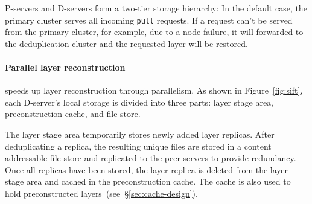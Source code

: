 P-servers and D-servers form a two-tier storage hierarchy:
In the default case, the primary cluster serves all incoming \texttt{pull} requests.
If a request can't be served from the primary cluster, for example, due to a node failure,
it will forwarded to the deduplication cluster and the requested layer will be restored.
%
%

\paragraph{Parallel layer reconstruction}

\sysname speeds up layer reconstruction through parallelism. As shown in Figure~\ref{fig:sift},
each D-server's local storage is divided into three parts: layer stage area, preconstruction cache,
and file store.
%

The layer stage area temporarily stores newly added layer replicas.
After deduplicating a replica, the resulting unique files are stored in a content 
addressable file store and replicated to the peer servers to
provide redundancy. Once all replicas have been stored, the layer replica is deleted from the
layer stage area and cached in the preconstruction cache. The cache is also used to hold
preconstructed layers~(see~\S\ref{sec:cache-design}).

